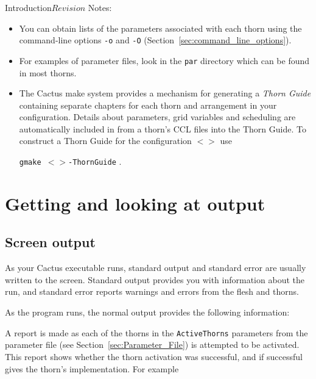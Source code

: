 \begin{cactuspart}{Introduction}{}{$Revision$}
Notes:

\begin{itemize}

\item{} You can obtain lists of the parameters associated with
each thorn using the command-line options \texttt{-o} and \texttt{-O}
(Section~\ref{sec:command_line_options}).

\item{} For examples of parameter files, look in the \texttt{par} directory
        which can be found in most thorns.

\item {}
The Cactus make system provides a mechanism for generating a
\textit{Thorn Guide} containing separate chapters for each thorn and
arrangement in your configuration. 
Details about parameters, grid variables and scheduling are
automatically included in from a thorn's CCL files into the Thorn
Guide. To construct a Thorn Guide for the configuration
\texttt{$<$$>$} use

\texttt{gmake $<$$>$-ThornGuide} .

\end{itemize}



\chapter{Getting and looking at output}


\section{Screen output}

As your Cactus executable runs, standard output and standard error
are usually written to the screen. Standard output provides you
with information about the run, and standard error reports warnings
and errors from the flesh and thorns.

As the program runs, the normal output provides the following information:

\begin{Lentry}

\item [Active thorns]
        A report is made as each of the thorns in the \texttt{ActiveThorns}
parameters from the parameter file (see Section~\ref{sec:Parameter_File})
is attempted to be activated. This report
shows whether the thorn activation was successful, and if successful gives the
thorn's implementation. For example


\end{Lentry}
\end{cactuspart}
